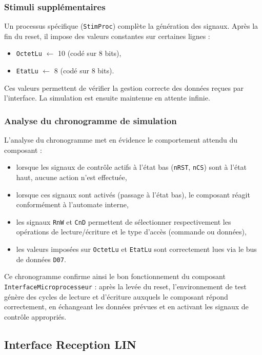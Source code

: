 \subsubsection{Stimuli supplémentaires}
Un processus spécifique (\texttt{StimProc}) complète la génération des signaux.  
Après la fin du reset, il impose des valeurs constantes sur certaines lignes :
\begin{itemize}
  \item \texttt{OctetLu} $\leftarrow$ 10 (codé sur 8 bits),
  \item \texttt{EtatLu} $\leftarrow$ 8 (codé sur 8 bits).
\end{itemize}
Ces valeurs permettent de vérifier la gestion correcte des données reçues par l’interface.  
La simulation est ensuite maintenue en attente infinie.

\subsubsection{Analyse du chronogramme de simulation}
L’analyse du chronogramme met en évidence le comportement attendu du composant :
\begin{itemize}
  \item lorsque les signaux de contrôle actifs à l’état bas (\texttt{nRST}, \texttt{nCS}) sont à l’état haut, aucune action n’est effectuée,
  \item lorsque ces signaux sont activés (passage à l’état bas), le composant réagit conformément à l’automate interne,
  \item les signaux \texttt{RnW} et \texttt{CnD} permettent de sélectionner respectivement les opérations de lecture/écriture et le type d’accès (commande ou données),
  \item les valeurs imposées sur \texttt{OctetLu} et \texttt{EtatLu} sont correctement lues via le bus de données \texttt{D07}.
\end{itemize}

Ce chronogramme confirme ainsi le bon fonctionnement du composant \texttt{InterfaceMicroprocesseur} :  
après la levée du reset, l’environnement de test génère des cycles de lecture et d’écriture auxquels le composant répond correctement, en échangeant les données prévues et en activant les signaux de contrôle appropriés.

\subsection{Interface Reception LIN}


